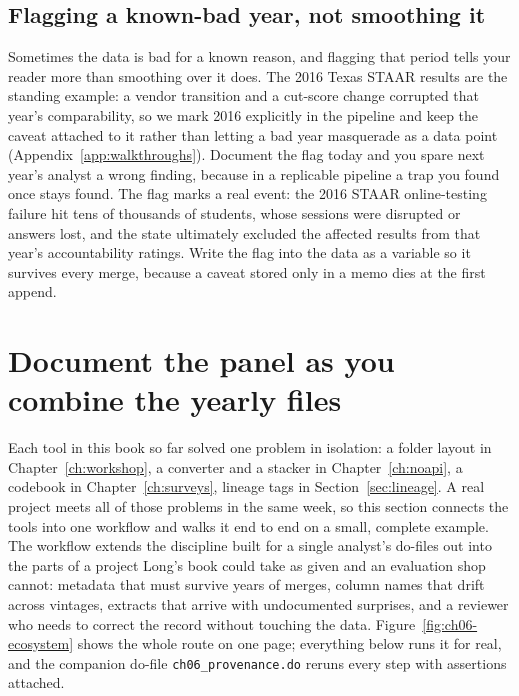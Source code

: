 \documentclass[
    a4paper,
    fontsize=10pt,
    twoside=true,
    numbers=noenddot,
]{kaobook}
\begin{document}
\subsection{Flagging a known-bad year, not smoothing it}\label{sec:ch06-pollutedyear}
Sometimes the data is bad for a known reason, and flagging that period tells your reader more than smoothing over it does. The 2016 Texas STAAR results are the standing example: a vendor transition and a cut-score change corrupted that year's comparability, so we mark 2016 explicitly in the pipeline and keep the caveat attached to it rather than letting a bad year masquerade as a data point (Appendix~\ref{app:walkthroughs}). Document the flag today and you spare next year's analyst a wrong finding, because in a replicable pipeline a trap you found once stays found. The flag marks a real event: the 2016 STAAR online-testing failure hit tens of thousands of students, whose sessions were disrupted or answers lost, and the state ultimately excluded the affected results from that year's accountability ratings. Write the flag into the data as a variable so it survives every merge, because a caveat stored only in a memo dies at the first append.

\section{Document the panel as you combine the yearly files}\label{sec:ch06-ecosystem}
Each tool in this book so far solved one problem in isolation: a folder layout in Chapter~\ref{ch:workshop}, a converter and a stacker in Chapter~\ref{ch:noapi}, a codebook in Chapter~\ref{ch:surveys}, lineage tags in Section~\ref{sec:lineage}. A real project meets all of those problems in the same week, so this section connects the tools into one workflow and walks it end to end on a small, complete example. The workflow extends the discipline \textcite{long2009workflow} built for a single analyst's do-files out into the parts of a project Long's book could take as given and an evaluation shop cannot: metadata that must survive years of merges, column names that drift across vintages, extracts that arrive with undocumented surprises, and a reviewer who needs to correct the record without touching the data. Figure~\ref{fig:ch06-ecosystem} shows the whole route on one page; everything below runs it for real, and the companion do-file \texttt{ch06\_provenance.do} reruns every step with assertions attached.
\end{document}
